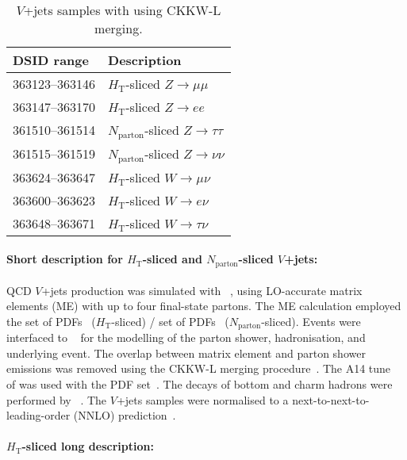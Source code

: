 \begin{table}[!htbp]
  \caption{$V$+jets samples with \MGPY[8] using CKKW-L merging.}%
  \label{tab:vjets-mg5py8_ckkwl}
  \centering
  \begin{tabular}{l l}
    \toprule
    DSID range & Description \\
    \midrule
    363123--363146 & $H_\text{T}$-sliced $Z\to\mu\mu$   \\
    363147--363170 & $H_\text{T}$-sliced $Z\to ee$     \\
    361510--361514 & $N_\text{parton}$-sliced $Z\to\tau\tau$ \\
    361515--361519 & $N_\text{parton}$-sliced $Z\to\nu\nu$   \\
    363624--363647 & $H_\text{T}$-sliced $W\to \mu\nu$   \\
    363600--363623 & $H_\text{T}$-sliced $W\to e\nu$    \\
    363648--363671 & $H_\text{T}$-sliced $W\to\tau\nu$  \\
    \bottomrule
  \end{tabular}
\end{table}

\paragraph{Short description for $H_\text{T}$-sliced and $N_\text{parton}$-sliced $V$+jets:}

QCD $V$+jets production was simulated with \MGNLO[2.2.2]~\cite{Alwall:2014hca}, 
using LO-accurate matrix elements (ME) with up to four final-state partons. 
The ME calculation employed the \NNPDF[3.0nlo] set of PDFs~\cite{Ball:2014uwa} 
($H_\text{T}$-sliced) / \NNPDF[2.3lo] set of PDFs~\cite{Ball:2012cx} ($N_\text{parton}$-sliced). 
Events were interfaced to \PYTHIA[8.186]~\cite{Sjostrand:2007gs} for the modelling
of the parton shower, hadronisation, and  underlying event. The overlap between
matrix element and parton shower emissions was removed using the CKKW-L
merging procedure~\cite{Lonnblad:2001iq,Lonnblad:2011xx}. The A14 
tune~\cite{ATL-PHYS-PUB-2014-021} of \PYTHIA[8] was used with the
\NNPDF[2.3lo] PDF set~\cite{Ball:2012cx}. 
The decays of bottom and charm
hadrons were performed by \EVTGEN[1.2.0]~\cite{Lange:2001uf}.
The $V$+jets samples were normalised to a next-to-next-to-leading-order (NNLO) 
prediction~\cite{Anastasiou:2003ds}.
 

\paragraph{$H_\text{T}$-sliced long description:}

